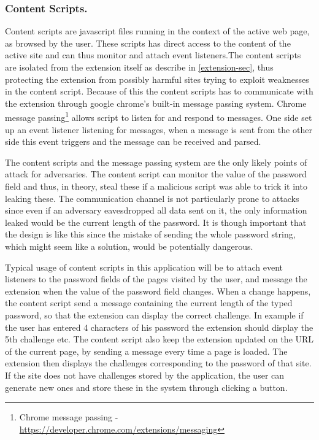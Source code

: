 \subsubsection{Content Scripts.}\label{cs}
Content scripts are javascript files running in the context of the active web page, as browsed by the user. These scripts has direct access to the content of the active site and can thus monitor and attach event listeners.The content scripts are isolated from the extension itself as describe in \autoref{extension-sec}, thus protecting the extension from possibly harmful sites trying to exploit weaknesses in the content script. Because of this the content scripts has to communicate with the extension through google chrome's built-in message passing system. Chrome message passing\footnote{Chrome message passing - \url{https://developer.chrome.com/extensions/messaging}} allows script to listen for and respond to messages. One side set up an event listener listening for messages, when a message is sent from the other side this event triggers and the message can be received and parsed. 
\par The content scripts and the message passing system are the only likely points of attack for adversaries. The content script can monitor the value of the password field and thus, in theory, steal these if a malicious script was able to trick it into leaking these. The communication channel is not particularly prone to attacks since even if an adversary eavesdropped all data sent on it, the only information leaked would be the current length of the password. It is though important that the design is like this since the mistake of sending the whole password string, which might seem like a solution, would be potentially dangerous. 
\par Typical usage of content scripts in this application will be to attach event listeners to the password fields of the pages visited by the user, and message the extension when the value of the password field changes. When a change happens, the content script send a message containing the current length of the typed password, so that the extension can display the correct challenge. In example if the user has entered 4 characters of his password the extension should display the 5th challenge etc. The content script also keep the extension updated on the URL of the current page, by sending a message every time a page is loaded. The extension then displays the challenges corresponding to the password of that site. If the site does not have challenges stored by the application, the user can generate new ones and store these in the system through clicking a button.  

